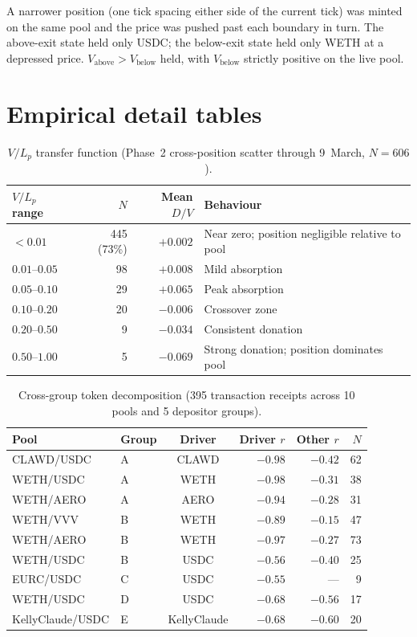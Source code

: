 \documentclass[11pt,a4paper]{article}
\theoremstyle{plain}
\begin{document}
A narrower position (one tick spacing either side of the current tick) was minted on the same pool and the price was pushed past each boundary in turn. The above-exit state held only USDC; the below-exit state held only WETH at a depressed price. $V_{\text{above}} > V_{\text{below}}$ held, with $V_{\text{below}}$ strictly positive on the live pool.

\section{Empirical detail tables}\label{app:empirical}

\begin{table}[H]
\centering
\caption{$V/L_p$ transfer function (Phase~2 cross-position scatter through 9~March, $N = 606$).}\label{tab:vl-buckets}
\begin{tabular}{@{}lrrl@{}}
\toprule
$V/L_p$ range & $N$ & Mean $D/V$ & Behaviour \\
\midrule
$< 0.01$       & 445 (73\%) & $+0.002$ & Near zero; position negligible relative to pool \\
$0.01$--$0.05$ & 98         & $+0.008$ & Mild absorption \\
$0.05$--$0.10$ & 29         & $+0.065$ & Peak absorption \\
$0.10$--$0.20$ & 20         & $-0.006$ & Crossover zone \\
$0.20$--$0.50$ & 9          & $-0.034$ & Consistent donation \\
$0.50$--$1.00$ & 5          & $-0.069$ & Strong donation; position dominates pool \\
\bottomrule
\end{tabular}
\end{table}

\begin{table}[H]
\centering
\caption{Cross-group token decomposition (395 transaction receipts across 10 pools and 5 depositor groups).}
\label{tab:cross-group}
\begin{tabular}{@{}llcrrr@{}}
\toprule
Pool & Group & Driver & Driver $r$ & Other $r$ & $N$ \\
\midrule
CLAWD/USDC       & A & CLAWD       & $-0.98$ & $-0.42$ & 62 \\
WETH/USDC        & A & WETH        & $-0.98$ & $-0.31$ & 38 \\
WETH/AERO        & A & AERO        & $-0.94$ & $-0.28$ & 31 \\
WETH/VVV         & B & WETH        & $-0.89$ & $-0.15$ & 47 \\
WETH/AERO        & B & WETH        & $-0.97$ & $-0.27$ & 73 \\
WETH/USDC        & B & USDC        & $-0.56$ & $-0.40$ & 25 \\
EURC/USDC        & C & USDC        & $-0.55$ & ---     & 9  \\
WETH/USDC        & D & USDC        & $-0.68$ & $-0.56$ & 17 \\
KellyClaude/USDC & E & KellyClaude & $-0.68$ & $-0.60$ & 20 \\
\bottomrule
\end{tabular}
\end{table}
\end{document}
